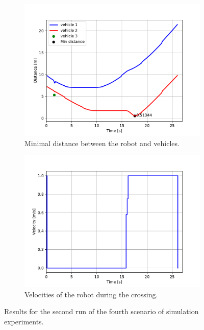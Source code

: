             \begin{figure}[H]
                \centering
                \begin{subfigure}{0.49\linewidth}
                    \centering
                    \includegraphics[trim={24 8 40 41}, clip, width=\linewidth]{images/simulations/scene4_2_dist.pdf}
                    \caption{Minimal distance between the robot and vehicles.}
                \end{subfigure}
                \begin{subfigure}{0.49\linewidth}
                    \centering
                    \includegraphics[trim={21 8 40 41}, clip, width=\linewidth]{images/simulations/scene4_2_vel.pdf}
                    \caption{Velocities of the robot during the crossing.}
                \end{subfigure}
                \caption{Results for the second run of the fourth scenario of simulation experiments.}
                \label{fig:scene4_2_graphs}
            \end{figure}
